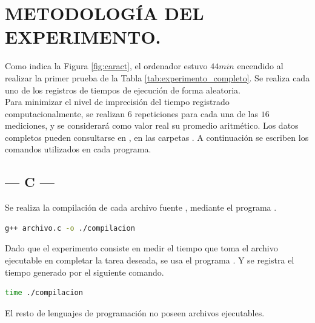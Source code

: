 \documentclass[11pt,a4paper]{article}
\begin{document}
\section{METODOLOGÍA DEL EXPERIMENTO.} %
Como indica la Figura \ref{fig:caract}, el ordenador estuvo \(44min\) encendido al realizar la primer prueba de la Tabla \ref{tab:experimento_completo}.
Se realiza cada uno de los registros de tiempos de ejecución de forma aleatoria. \\[2mm]
Para minimizar el nivel de imprecisión del tiempo registrado computacionalmente, se realizan \(6\) repeticiones para cada una de las \(16\) mediciones, y se considerará como valor real su promedio aritmético.
Los datos completos pueden consultarse en , en las carpetas .
A continuación se escriben los comandos utilizados en cada programa. \\[2mm]
\begin{minipage}{0.5\linewidth}
	\subsection{--- C ---} %
	\label{sub:lenguaje_c}
	Se realiza la compilación de cada archivo fuente , mediante el programa .
	\begin{lstlisting}[language = bash]
g++ archivo.c -o ./compilacion
	\end{lstlisting}
	Dado que el experimento consiste en medir el tiempo que toma el archivo ejecutable  en completar la tarea deseada, se usa el programa . Y se registra el tiempo generado por el siguiente comando.
	\begin{lstlisting}[language = bash]
time ./compilacion
	\end{lstlisting}
	El resto de lenguajes de programación no poseen archivos ejecutables.
\end{minipage}\hspace{5mm}
\end{document}
